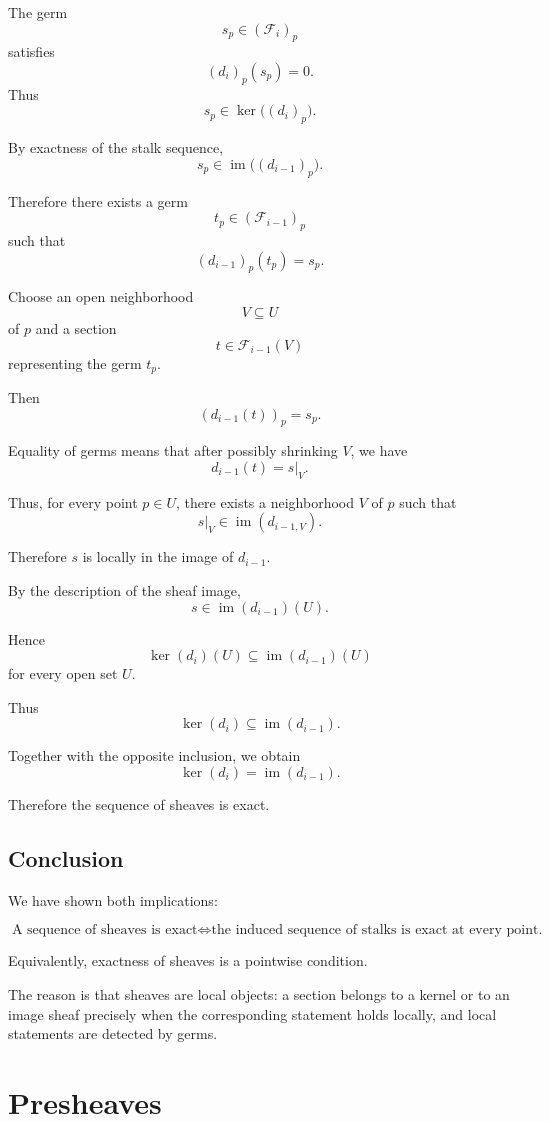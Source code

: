 \documentclass[12pt,a4paper]{article}
\begin{document}
The germ
\[
s_p \in (\mathcal F_i)_p
\]
satisfies
\[
(d_i)_p(s_p)=0.
\]
Thus
\[
s_p \in \ker\bigl((d_i)_p\bigr).
\]

By exactness of the stalk sequence,
\[
s_p \in \operatorname{im}\bigl((d_{i-1})_p\bigr).
\]

Therefore there exists a germ
\[
t_p \in (\mathcal F_{i-1})_p
\]
such that
\[
(d_{i-1})_p(t_p)=s_p.
\]

Choose an open neighborhood
\[
V \subseteq U
\]
of $p$ and a section
\[
t \in \mathcal F_{i-1}(V)
\]
representing the germ $t_p$.

Then
\[
(d_{i-1}(t))_p = s_p.
\]

Equality of germs means that after possibly shrinking $V$, we have
\[
d_{i-1}(t) = s|_V.
\]

Thus, for every point $p \in U$, there exists a neighborhood $V$ of $p$ such
that
\[
s|_V \in \operatorname{im}(d_{i-1,V}).
\]

Therefore $s$ is locally in the image of $d_{i-1}$.

By the description of the sheaf image,
\[
s \in \operatorname{im}(d_{i-1})(U).
\]

Hence
\[
\ker(d_i)(U)
\subseteq
\operatorname{im}(d_{i-1})(U)
\]
for every open set $U$.

Thus
\[
\ker(d_i)
\subseteq
\operatorname{im}(d_{i-1}).
\]

Together with the opposite inclusion, we obtain
\[
\ker(d_i)
=
\operatorname{im}(d_{i-1}).
\]

Therefore the sequence of sheaves is exact.

\subsection*{Conclusion}

We have shown both implications:

\[
\boxed{
	\text{A sequence of sheaves is exact}
	\iff
	\text{the induced sequence of stalks is exact at every point.}
}
\]

Equivalently, exactness of sheaves is a pointwise condition.

The reason is that sheaves are local objects: a section belongs to a kernel or
to an image sheaf precisely when the corresponding statement holds locally,
and local statements are detected by germs.

\section{Presheaves}
\end{document}
